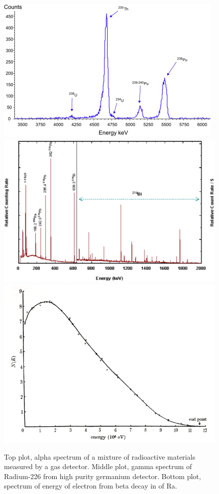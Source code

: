 \begin{figure}[!htb]
\centering
\includegraphics[scale=0.8]{Figures/Chapter1/alphaspectrum.jpg}
\includegraphics[scale=0.2]{Figures/Chapter1/radspec_gamma.png}
\includegraphics[scale=0.25]{Figures/Chapter1/Ra_betaSpec.png}

        \caption{Top plot, alpha spectrum of a mixture of radioactive materials measured by a gas detector\cite{alphaSpectrum}. Middle plot, gamma spectrum of Radium-226 from high purity germanium detector\cite{RaSpectrum_gamma}. Bottom plot, spectrum of energy of electron from beta decay in of Ra\cite{Ra_betaSpec}.} 
\label{fig:abgSpectrum}
\end{figure}

